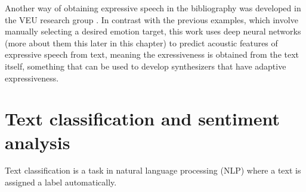 Another way of obtaining expressive speech in the bibliography was developed in the VEU research group \cite{jauk2016acoustic}. In contrast with the previous examples, which involve manually selecting a desired emotion target, this work uses deep neural networks (more about them this later in this chapter) to predict acoustic features of expressive speech from text, meaning the exressiveness is obtained from the text itself, something that can be used to develop synthesizers that have adaptive expressiveness.



\section{Text classification and sentiment analysis}

Text classification is a task in natural language processing \cite{chowdhury2003natural} (NLP) where a text is assigned a label automatically.

